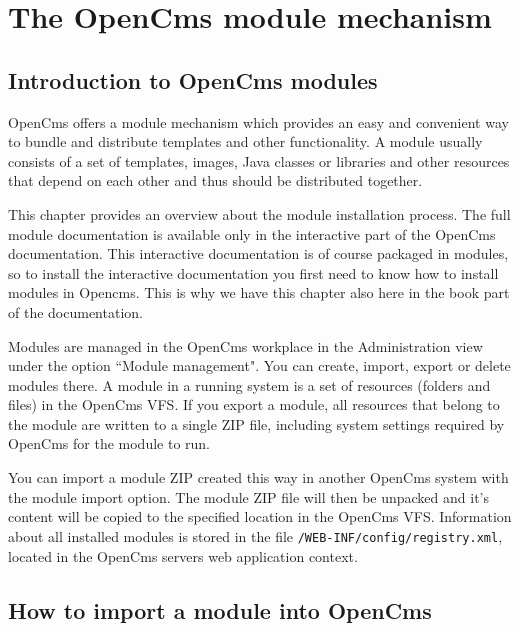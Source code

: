 \chapter{The OpenCms module mechanism}
\label{The OpenCms module mechanism} 


\section{Introduction to OpenCms modules}
OpenCms offers a module mechanism which provides an easy and convenient way to bundle and distribute templates 
and other functionality. A module usually consists of a set of templates, images, Java classes or libraries 
and other resources that depend on each other and thus should be distributed together.

This chapter provides an overview about the module installation process.
The full module documentation is available only in the interactive part of the OpenCms documentation.
This interactive documentation is of course packaged in modules, so to install the interactive 
documentation you first need to know how to install modules in Opencms.
This is why we have this chapter also here in the book part of the documentation.

Modules are managed in the OpenCms workplace in the Administration view under the option ``Module management". 
You can create, import, export or delete modules there. 
A module in a running system is a set of resources (folders and files) in the OpenCms VFS. 
If you export a module, all resources that belong to the module are written to a single ZIP file, 
including system settings required by OpenCms for the module to run.

You can import a module ZIP created this way in another OpenCms system with the module import option. 
The module ZIP file will then be unpacked and it's content will be copied to the specified location in the OpenCms VFS. 
Information about all installed modules is stored in the file \texttt{/WEB-INF/config/registry.xml}, 
located in the OpenCms servers web application context.

\section{How to import a module into OpenCms}


